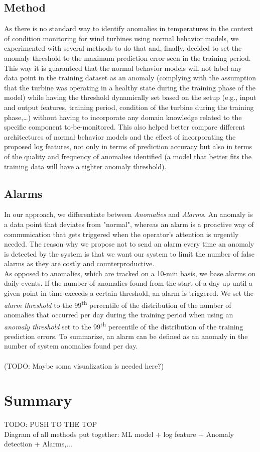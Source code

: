   \subsection{Method}
    As there is no standard way to identify anomalies in temperatures in the context of condition monitoring for wind turbines using normal behavior models, we experimented 
    with several methods to do that and, finally, decided to set the anomaly threshold to the maximum prediction error seen in the training period. This way it is 
    guaranteed that the normal behavior models will not label any data point in the training dataset as an anomaly (complying with the assumption that the turbine was operating 
    in a healthy state during the training phase of the model) while having the threshold dynamically set based on the setup (e.g., 
    input and output features, training period, condition of the turbine during the training phase,\dots) without having to incorporate any domain knowledge related to the 
    specific component to-be-monitored. This also helped better compare different architectures of normal behavior models and the effect of incorporating the proposed log features, 
    not only in terms of prediction accuracy but also in terms of the quality and frequency of anomalies identified (a model that better fits the training data will have a 
    tighter anomaly threshold).

  \subsection{Alarms}
    In our approach, we differentiate between \emph{Anomalies} and \emph{Alarms}. An anomaly is a data point that deviates from "normal", whereas an alarm is a proactive 
    way of communication that gets triggered when the operator's attention is urgently needed. The reason why we propose not to send an alarm every time an anomaly is 
    detected by the system is that we want our system to limit the number of false alarms as they are costly and counterproductive.\\
    As opposed to anomalies, which are tracked on a 10-min basis, we base alarms on daily events. If the number of anomalies found from the start of a day up until a given 
    point in time exceeds a certain threshold, an alarm is triggered. We set the \emph{alarm threshold} to the 99\textsuperscript{th} percentile of the distribution of the number of 
    anomalies that occurred per day during the training period when using an \emph{anomaly threshold} set to the 99\textsuperscript{th} percentile of the distribution of the 
    training prediction errors. To summarize, an alarm can be defined as an anomaly in the number of system anomalies found per day.\\
    \\
    (TODO: Maybe soma visualization is needed here?)


\section{Summary}
TODO:
PUSH TO THE TOP\\
Diagram of all methods put together: ML model + log feature + Anomaly detection + Alarms,...